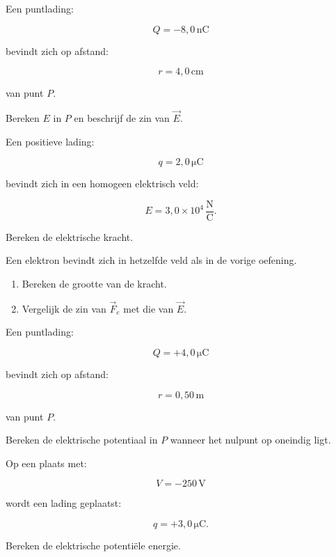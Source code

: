 \documentclass{ximera}
\begin{document}
\begin{oefening}{\oefB\ESS}

Een puntlading:

\[
Q=-8{,}0\,\mathrm{nC}
\]

bevindt zich op afstand:

\[
r=4{,}0\,\mathrm{cm}
\]

van punt $P$.

Bereken $E$ in $P$ en beschrijf de zin van $\vec E$.

\end{oefening}


\begin{oefening}{\oefB\ESS}

Een positieve lading:

\[
q=2{,}0\,\mathrm{\mu C}
\]

bevindt zich in een homogeen elektrisch veld:

\[
E=3{,}0\times10^4\,\mathrm{\frac NC}.
\]

Bereken de elektrische kracht.

\end{oefening}


\begin{oefening}[Elektron]{\oefB\ESS}

Een elektron bevindt zich in hetzelfde veld als in de vorige
oefening.

\begin{enumerate}
  \item Bereken de grootte van de kracht.
  \item Vergelijk de zin van $\vec F_e$ met die van $\vec E$.
\end{enumerate}

\end{oefening}


\begin{oefening}{\oefB\ESS}

Een puntlading:

\[
Q=+4{,}0\,\mathrm{\mu C}
\]

bevindt zich op afstand:

\[
r=0{,}50\,\mathrm m
\]

van punt $P$.

Bereken de elektrische potentiaal in $P$ wanneer het nulpunt op
oneindig ligt.

\end{oefening}


\begin{oefening}{\oefB\ESS}

Op een plaats met:

\[
V=-250\,\mathrm V
\]

wordt een lading geplaatst:

\[
q=+3{,}0\,\mathrm{\mu C}.
\]

Bereken de elektrische potentiële energie.

\end{oefening}
\end{document}

